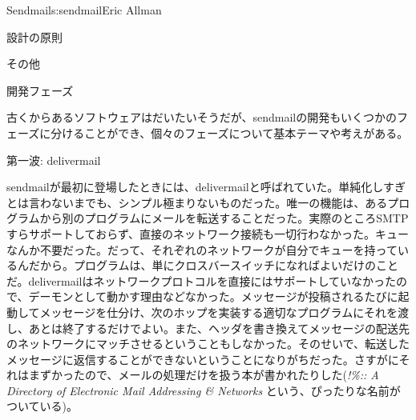 \begin{aosachapter}{Sendmail}{s:sendmail}{Eric Allman}
\begin{aosasect1}{設計の原則}
\begin{aosasect2}{その他}
\end{aosasect2}

\end{aosasect1}

\begin{aosasect1}{開発フェーズ}

古くからあるソフトウェアはだいたいそうだが、sendmailの開発もいくつかのフェーズに分けることができ、個々のフェーズについて基本テーマや考えがある。

\begin{aosasect2}{第一波: delivermail}

sendmailが最初に登場したときには、delivermailと呼ばれていた。単純化しすぎとは言わないまでも、シンプル極まりないものだった。唯一の機能は、あるプログラムから別のプログラムにメールを転送することだった。実際のところSMTPすらサポートしておらず、直接のネットワーク接続も一切行わなかった。キューなんか不要だった。だって、それぞれのネットワークが自分でキューを持っているんだから。プログラムは、単にクロスバースイッチになればよいだけのことだ。delivermailはネットワークプロトコルを直接にはサポートしていなかったので、デーモンとして動かす理由などなかった。メッセージが投稿されるたびに起動してメッセージを仕分け、次のホップを実装する適切なプログラムにそれを渡し、あとは終了するだけでよい。また、ヘッダを書き換えてメッセージの配送先のネットワークにマッチさせるということもしなかった。そのせいで、転送したメッセージに返信することができないということになりがちだった。さすがにそれはまずかったので、メールの処理だけを扱う本が書かれたりした(\emph{!\%\@:: A Directory of Electronic Mail Addressing \& Networks} \cite{bib:adams:email} という、ぴったりな名前がついている)。


\end{aosasect2}
\end{aosasect1}
\end{aosachapter}
